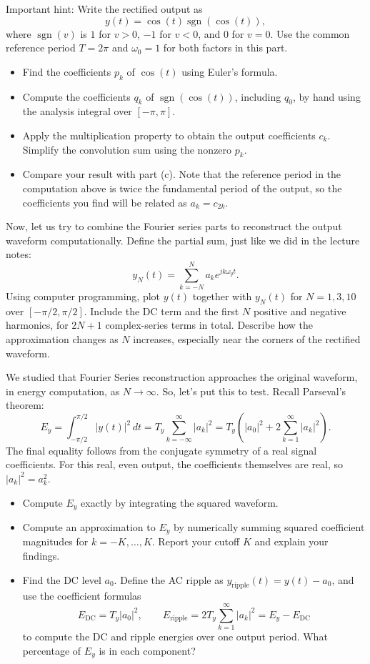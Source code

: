 \documentclass{ee102_pset}
\begin{document}
Important hint: Write the rectified output as
\[
y(t)=\cos(t)\operatorname{sgn}(\cos(t)),
\]
where $\operatorname{sgn}(v)$ is $1$ for $v>0$, $-1$ for $v<0$, and $0$
for $v=0$. Use the common reference period $T=2\pi$ and $\omega_0=1$
for both factors in this part.
\begin{itemize}
  \item Find the coefficients $p_k$ of $\cos(t)$ using Euler's formula.
  \item Compute the coefficients $q_k$ of $\operatorname{sgn}(\cos(t))$, including $q_0$, by hand using the analysis integral over $[-\pi,\pi]$.
  \item Apply the multiplication property to obtain the output
  coefficients $c_k$. Simplify the convolution sum using the nonzero $p_k$.
  \item Compare your result with part (c). Note that the reference period in the computation above is twice the fundamental period of the output, so the coefficients you find will be related
  as $a_k=c_{2k}$. 
\end{itemize}

\problempart[10 points] Now, let us try to combine the Fourier series parts to reconstruct the output waveform computationally.
Define the partial sum, just like we did in the lecture notes:
\[
y_N(t)=\sum_{k=-N}^{N}a_k e^{jk\omega_y t}.
\]
Using computer programming, plot $y(t)$ together with $y_N(t)$ for
$N=1,3,10$ over $[-\pi/2,\pi/2]$. Include the DC term and the first $N$
positive and negative harmonics, for $2N+1$ complex-series terms in total.
Describe how the approximation changes as $N$ increases, especially near
the corners of the rectified waveform.

\problempart[20 points] We studied that Fourier Series reconstruction approaches the original waveform, in energy computation, as $N\to\infty$. So, let's put this to test. 
Recall Parseval's theorem:
\[
E_y=\int_{-\pi/2}^{\pi/2}|y(t)|^2\,dt
=T_y\sum_{k=-\infty}^{\infty}|a_k|^2
=T_y\left(|a_0|^2+2\sum_{k=1}^{\infty}|a_k|^2\right).
\]
The final equality follows from the conjugate symmetry of a real signal
coefficients. For this real, even output, the coefficients themselves are
real, so $|a_k|^2=a_k^2$.
\begin{itemize}
  \item Compute $E_y$ exactly by integrating the squared waveform.
  \item Compute an approximation to $E_y$ by numerically summing squared
  coefficient magnitudes for $k=-K,\ldots,K$. Report your cutoff $K$ and explain your findings.
  \item Find the DC level $a_0$. Define the AC ripple as
  $y_{\mathrm{ripple}}(t)=y(t)-a_0$, and use the coefficient formulas
  \[
  E_{\mathrm{DC}}=T_y|a_0|^2,\qquad
  E_{\mathrm{ripple}}=2T_y\sum_{k=1}^{\infty}|a_k|^2
  =E_y-E_{\mathrm{DC}}
  \]
  to compute the DC and ripple energies over one output period. What
  percentage of $E_y$ is in each component?
\end{itemize}
\end{document}
